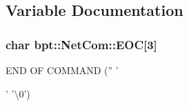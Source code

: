 \subsection{Variable Documentation}
\hypertarget{namespacebpt_1_1_net_com_a34151047272d9eaf1e68367bc276e11a}{
\subsubsection[{E\-O\-C}]{\setlength{\rightskip}{0pt plus 5cm}char bpt\-::\-Net\-Com\-::\-E\-O\-C\mbox{[}3\mbox{]}}}\label{namespacebpt_1_1_net_com_a34151047272d9eaf1e68367bc276e11a}


E\-N\-D O\-F C\-O\-M\-M\-A\-N\-D ('' '\par
' '\textbackslash{}0') 

